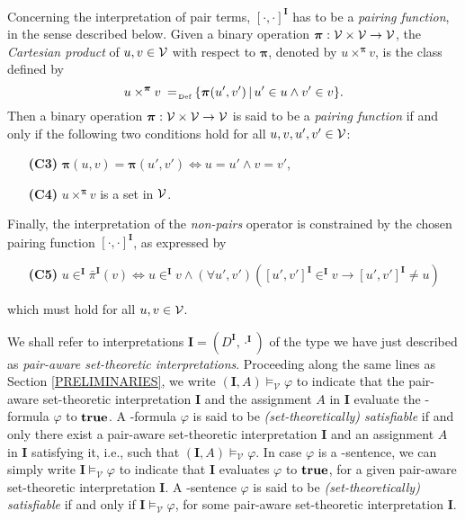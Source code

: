 \documentclass[a4paper]{llncs}
\newcommand{\nonpairssym}{\bar{\pi}}
\newcommand{\inter}{\ensuremath{\mathbf{I}}\xspace}
\newcommand{\vmodels}[2]{#1 \models_{\mathcal{V}} #2}
\newcommand{\vsat}[1]{\vmodels{*}{#1}}
\begin{document}
Concerning the interpretation of pair terms, $[\cdot,\cdot]^{\inter}$ 
has to be a \emph{pairing function},
in the sense described below.
Given a binary operation $\boldsymbol{\pi}: \mathcal{V} \times \mathcal{V} 
\rightarrow \mathcal{V}$, the \emph{Cartesian product} of $u, v \in \mathcal{V}$ 
with
respect to $\boldsymbol{\pi}$, denoted by $u 
\times^{\boldsymbol{\pi}} v$, is the class defined by
\[
u \times^{\boldsymbol{\pi}} v \defAs \{ \boldsymbol{\pi}(u',v') \,|\, 
u' \in u \wedge v' \in v \}.
\]
Then a binary operation $\boldsymbol{\pi}: \mathcal{V} \times \mathcal{V} 
\rightarrow \mathcal{V}$ is said to be a \emph{pairing function} if
and only if the following two conditions hold for all $u,v,u',v' \in
\mathcal{V}$:
\begin{enumerate}[leftmargin=.9cm]
  \item[\textbf{(C3)}]$\boldsymbol{\pi}(u,v)=\boldsymbol{\pi}(u',v') 
\iff u=u' \wedge v=v'$,
  \item[\textbf{(C4)}]$u \times^{\boldsymbol{\pi}} v$ is a set in $\mathcal{V}$.
\end{enumerate}
Finally, the interpretation of the
\emph{non-pairs} operator is constrained by the chosen
pairing function $[\cdot,\cdot]^\inter$, as expressed by
\begin{enumerate}[leftmargin=.9cm]
  \item[\textbf{(C5)}]\label{NONPAIR}
$u \in^{\inter} \nonpairssym^{\inter}(v) \iff u \in^{\inter} v \wedge 
(\forall u', v')([u', v']^{\inter} \in^{\inter} v \rightarrow [u', 
v']^{\inter}\neq u)
$
\end{enumerate}
which must hold for all $u,v \in \mathcal{V}$.

We shall refer to interpretations $\inter=(D^{\inter}, \cdot^\inter)$ 
of the type we have just described as
\emph{pair-aware set-theoretic interpretations}. Proceeding along the same lines as Section \ref{PRELIMINARIES},  we write 
$\vmodels{(\inter, A)}{\varphi}$ to indicate that the pair-aware set-theoretic interpretation $\inter$ and the assignment $A$ in $\inter$ evaluate the \Forallpizero-formula $\varphi$ to $\mathbf{true}$. A \Forallpizero-formula $\varphi$ is said to be
\emph{(set-theoretically) satisfiable}
if and only there exist a pair-aware
set-theoretic interpretation $\inter$ and an assignment $A$ in $\inter$ satisfying it,
i.e., such that $\vmodels{(\inter,A)}{\varphi}$. In case $\varphi$ is a 
\Forallpizero-sentence, we can simply write $\vmodels{\inter}{\varphi}$ to indicate that $\inter$ evaluates $\varphi$ to $\mathbf{true}$, for a given  
pair-aware set-theoretic interpretation $\inter$. A \Forallpizero-sentence $\varphi$ is said to be
\emph{(set-theoretically) satisfiable} if and only if $\vmodels{\inter}{\varphi}$, for some 
pair-aware set-theoretic interpretation $\inter$. 
\end{document}
